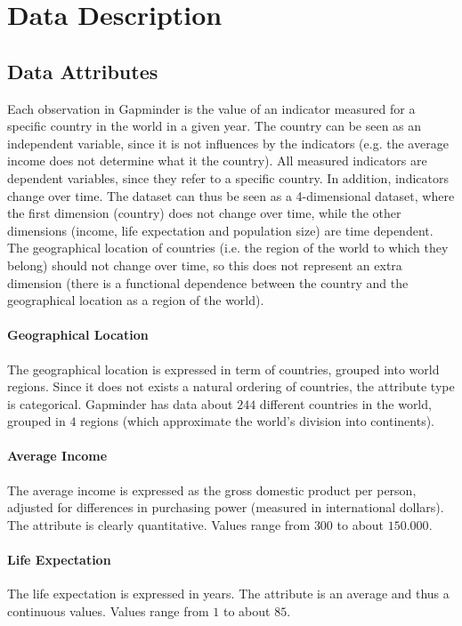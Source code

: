 \section{Data Description}
\label{sec:data}

\subsection{Data Attributes}
Each observation in Gapminder is the value of an indicator measured for a specific country in the world in a given year.
The country can be seen as an independent variable, since it is not influences by the indicators (e.g. the average income does not determine what it the country).
All measured indicators are dependent variables, since they refer to a specific country.
In addition, indicators change over time.
The dataset can thus be seen as a 4-dimensional dataset, where the first dimension (country) does not change over time, while the other dimensions (income, life expectation and population size) are time dependent.
The geographical location of countries (i.e. the region of the world to which they belong) should not change over time, so this does not represent an extra dimension (there is a functional dependence between the country and the geographical location as a region of the world).

\paragraph{Geographical Location}
The geographical location is expressed in term of countries, grouped into world regions.
Since it does not exists a natural ordering of countries, the attribute type is categorical.
Gapminder has data about $244$ different countries in the world, grouped in $4$ regions (which approximate the world's division into continents).

\paragraph{Average Income}
The average income is expressed as the gross domestic product per person, adjusted for differences in purchasing power (measured in international dollars).
The attribute is clearly quantitative.
Values range from $300$ to about $150.000$.

\paragraph{Life Expectation}
The life expectation is expressed in years.
The attribute is an average and thus a continuous values. 
Values range from $1$ to about $85$.

